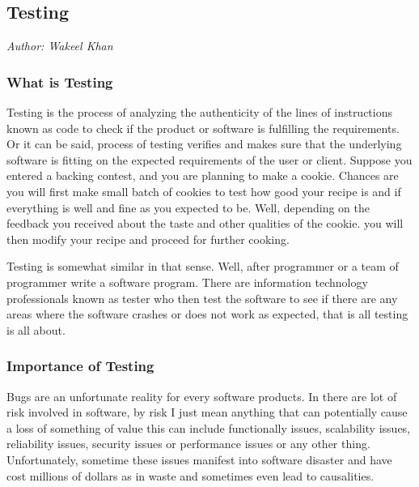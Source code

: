 

\subsection{Testing}\label{sec:Testing}

\textit{Author: Wakeel Khan}

\subsubsection{What is Testing}

Testing is the process of analyzing the authenticity of the lines of instructions known as code to check if the product or software is fulfilling the requirements. Or it can be said, process of testing verifies and makes sure that the underlying software is fitting on the expected requirements of the user or client. Suppose you entered a backing contest, and you are planning to make a cookie. Chances are you will first make small batch of cookies to test how good your recipe is and if everything is well and fine as you expected to be. Well, depending on the feedback you received about the taste and other qualities of the cookie. you will then modify your recipe and proceed for further cooking.\par

Testing is somewhat similar in that sense. Well, after programmer or a team of programmer write a software program. There are information technology professionals known as tester who then test the software to see if there are any areas where the software crashes or does not work as expected, that is all testing is all about.

\subsubsection{Importance of Testing}

Bugs are an unfortunate reality for every software products. In there are lot of risk involved in software, by risk I just mean anything that can potentially cause a loss of something of value this can include functionally issues, scalability issues, reliability issues, security issues or performance issues or any other thing. Unfortunately, sometime these issues manifest into software disaster and have cost millions of dollars as in waste and sometimes even lead to causalities. \par

